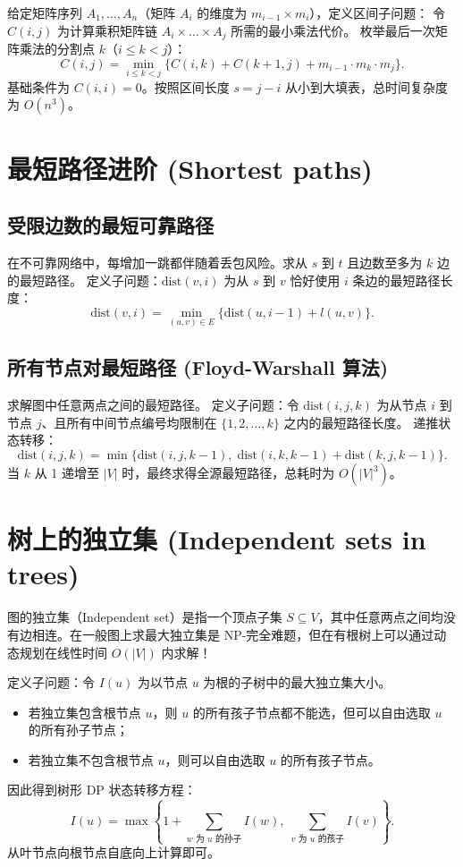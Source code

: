 给定矩阵序列 $A_1, \dots, A_n$（矩阵 $A_i$ 的维度为 $m_{i-1} \times m_i$），定义区间子问题：
令 $C(i, j)$ 为计算乘积矩阵链 $A_i \times \dots \times A_j$ 所需的最小乘法代价。
枚举最后一次矩阵乘法的分割点 $k$（$i \le k < j$）：
\[
C(i, j) = \min_{i \le k < j} \{C(i, k) + C(k + 1, j) + m_{i-1} \cdot m_k \cdot m_j\}.
\]
基础条件为 $C(i, i) = 0$。按照区间长度 $s = j - i$ 从小到大填表，总时间复杂度为 $O(n^3)$。

\section{最短路径进阶 (Shortest paths)}

\subsection{受限边数的最短可靠路径}
在不可靠网络中，每增加一跳都伴随着丢包风险。求从 $s$ 到 $t$ 且边数至多为 $k$ 边的最短路径。
定义子问题：$\text{dist}(v, i)$ 为从 $s$ 到 $v$ 恰好使用 $i$ 条边的最短路径长度：
\[
\text{dist}(v, i) = \min_{(u, v) \in E} \{\text{dist}(u, i - 1) + l(u, v)\}.
\]

\subsection{所有节点对最短路径 (Floyd-Warshall 算法)}
求解图中任意两点之间的最短路径。
定义子问题：令 $\text{dist}(i, j, k)$ 为从节点 $i$ 到节点 $j$、且所有中间节点编号均限制在 $\{1, 2, \dots, k\}$ 之内的最短路径长度。
递推状态转移：
\[
\text{dist}(i, j, k) = \min \{\text{dist}(i, j, k - 1),\; \text{dist}(i, k, k - 1) + \text{dist}(k, j, k - 1)\}.
\]
当 $k$ 从 1 递增至 $|V|$ 时，最终求得全源最短路径，总耗时为 $O(|V|^3)$。

\section{树上的独立集 (Independent sets in trees)}

图的独立集（Independent set）是指一个顶点子集 $S \subseteq V$，其中任意两点之间均没有边相连。在一般图上求最大独立集是 NP-完全难题，但在有根树上可以通过动态规划在线性时间 $O(|V|)$ 内求解！

定义子问题：令 $I(u)$ 为以节点 $u$ 为根的子树中的最大独立集大小。
\begin{itemize}
    \item 若独立集包含根节点 $u$，则 $u$ 的所有孩子节点都不能选，但可以自由选取 $u$ 的所有孙子节点；
    \item 若独立集不包含根节点 $u$，则可以自由选取 $u$ 的所有孩子节点。
\end{itemize}
因此得到树形 DP 状态转移方程：
\[
I(u) = \max \left\{ 1 + \sum_{w \text{ 为 } u \text{ 的孙子}} I(w),\; \sum_{v \text{ 为 } u \text{ 的孩子}} I(v) \right\}.
\]
从叶节点向根节点自底向上计算即可。

